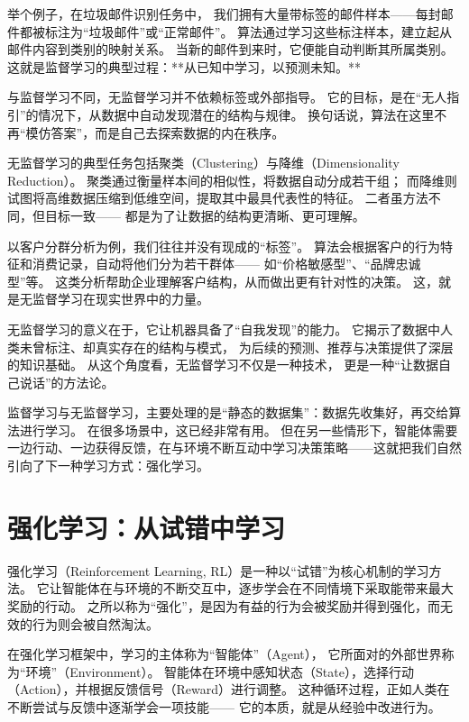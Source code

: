 举个例子，在垃圾邮件识别任务中，  
我们拥有大量带标签的邮件样本——每封邮件都被标注为“垃圾邮件”或“正常邮件”。  
算法通过学习这些标注样本，建立起从邮件内容到类别的映射关系。  
当新的邮件到来时，它便能自动判断其所属类别。  
这就是监督学习的典型过程：**从已知中学习，以预测未知。**



与监督学习不同，无监督学习并不依赖标签或外部指导。  
它的目标，是在“无人指引”的情况下，从数据中自动发现潜在的结构与规律。  
换句话说，算法在这里不再“模仿答案”，而是自己去探索数据的内在秩序。



无监督学习的典型任务包括聚类（Clustering）与降维（Dimensionality Reduction）。  
聚类通过衡量样本间的相似性，将数据自动分成若干组；  
而降维则试图将高维数据压缩到低维空间，提取其中最具代表性的特征。  
二者虽方法不同，但目标一致——  
都是为了让数据的结构更清晰、更可理解。



以客户分群分析为例，我们往往并没有现成的“标签”。  
算法会根据客户的行为特征和消费记录，自动将他们分为若干群体——  
如“价格敏感型”、“品牌忠诚型”等。  
这类分析帮助企业理解客户结构，从而做出更有针对性的决策。  
这，就是无监督学习在现实世界中的力量。



无监督学习的意义在于，它让机器具备了“自我发现”的能力。  
它揭示了数据中人类未曾标注、却真实存在的结构与模式，  
为后续的预测、推荐与决策提供了深层的知识基础。  
从这个角度看，无监督学习不仅是一种技术，  
更是一种“让数据自己说话”的方法论。



监督学习与无监督学习，主要处理的是“静态的数据集”：数据先收集好，再交给算法进行学习。  
在很多场景中，这已经非常有用。  
但在另一些情形下，智能体需要一边行动、一边获得反馈，在与环境不断互动中学习决策策略——这就把我们自然引向了下一种学习方式：强化学习。

\section{强化学习：从试错中学习}

强化学习（Reinforcement Learning, RL）是一种以“试错”为核心机制的学习方法。  
它让智能体在与环境的不断交互中，逐步学会在不同情境下采取能带来最大奖励的行动。  
之所以称为“强化”，是因为有益的行为会被奖励并得到强化，而无效的行为则会被自然淘汰。



在强化学习框架中，学习的主体称为“智能体”（Agent），  
它所面对的外部世界称为“环境”（Environment）。  
智能体在环境中感知状态（State），选择行动（Action），并根据反馈信号（Reward）进行调整。  
这种循环过程，正如人类在不断尝试与反馈中逐渐学会一项技能——  
它的本质，就是从经验中改进行为。



